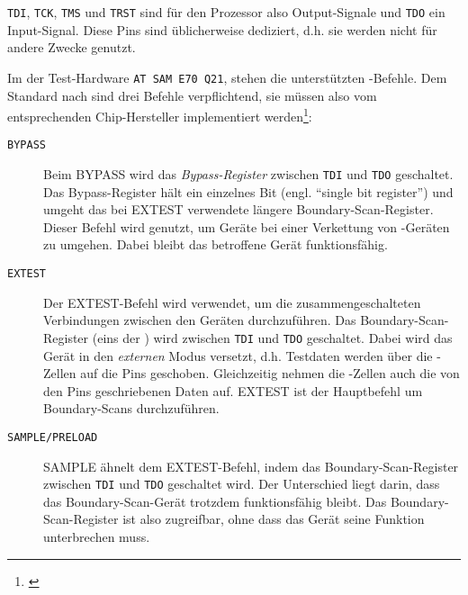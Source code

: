     \texttt{TDI}, \texttt{TCK}, \texttt{TMS} und \texttt{TRST} sind für den Prozessor also Output-Signale und
    \texttt{TDO} ein Input-Signal.
    Diese Pins sind üblicherweise dediziert, d.h. sie werden nicht für andere Zwecke genutzt.

    Im  der Test-Hardware \texttt{AT SAM E70 Q21}, stehen die unterstützten -Befehle. Dem Standard nach
    sind drei Befehle verpflichtend, sie müssen also vom entsprechenden Chip-Hersteller implementiert werden\footnote{
    \citep[]{Corelis}}:
    \begin{description}
    \item[\texttt{BYPASS}] Beim BYPASS wird das \textit{Bypass-Register} zwischen \texttt{TDI} und \texttt{TDO}
    geschaltet. Das Bypass-Register hält ein einzelnes Bit (engl. ``single bit register'') und umgeht das bei EXTEST
    verwendete längere Boundary-Scan-Register. Dieser Befehl wird genutzt, um Geräte bei einer Verkettung von
    -Geräten zu umgehen. Dabei bleibt das betroffene Gerät funktionsfähig.
    \item[\texttt{EXTEST}] Der EXTEST-Befehl wird verwendet, um die zusammengeschalteten Verbindungen zwischen den
    Geräten durchzuführen. Das Boundary-Scan-Register (eins der ) wird zwischen \texttt{TDI} und
    \texttt{TDO} geschaltet.
    Dabei wird das Gerät in den \textit{externen} Modus versetzt, d.h. Testdaten werden über die
    -Zellen auf die Pins geschoben. Gleichzeitig nehmen die -Zellen auch die von den Pins geschriebenen Daten
    auf. EXTEST ist der Hauptbefehl um Boundary-Scans durchzuführen.
    \item[\texttt{SAMPLE/PRELOAD}] SAMPLE ähnelt dem EXTEST\hyp{}Befehl, indem das Boundary\hyp{}Scan\hyp{}Register zwischen
    \texttt{TDI} und \texttt{TDO} geschaltet wird. Der Unterschied liegt darin, dass das Boundary-Scan-Gerät trotzdem
    funktionsfähig bleibt. Das Boundary-Scan-Register ist also zugreifbar, ohne dass das Gerät seine
    Funktion unterbrechen muss.
    \end{description}

